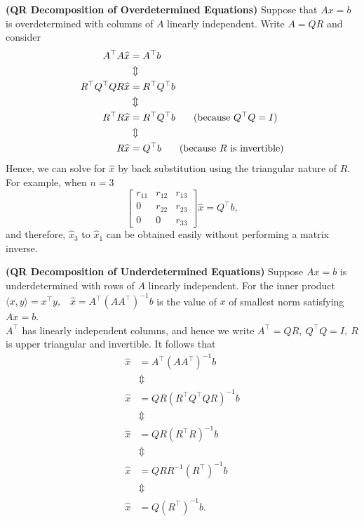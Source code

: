 \begin{example} \textbf{(QR Decomposition of Overdetermined Equations)} Suppose that $Ax=b$ is overdetermined with columns of $A$ linearly independent. Write $A=QR$ and consider
	        \begin{align*}
	            A^\top A\widehat{x}&=A^\top b\\
	            & \Updownarrow \\
	           R^\top Q^\top QR \widehat{x}& = R^\top Q^\top b\\
	           & \Updownarrow \\
	           R^\top R \widehat{x}& = R^\top Q^\top b \textnormal{ \hspace{1pc} (because $Q^\top Q = I$)}\\
	            & \Updownarrow \\
	           R \widehat{x} & =  Q^\top b \textnormal{ \hspace{1pc} (because $R$ is invertible)}
	        \end{align*}
Hence, we can solve for $\widehat{x}$ by back substitution using the triangular nature of $R$.	        For example, when $n=3$
	        $$\begin{bmatrix} r_{11} & r_{12} & r_{13}\\ 0 & r_{22} &r_{23}\\ 0 & 0 & r_{33} \end{bmatrix}\widehat{x}=Q^\top b,$$
and therefore, $\widehat{x}_3$ to $\widehat{x}_1$ can be obtained easily without performing a matrix inverse.
\end{example}

\begin{example} \textbf{(QR Decomposition of Underdetermined Equations)} Suppose $Ax=b$ is underdetermined with rows of $A$ linearly independent. For the inner product $\langle x,y\rangle=x^\top y,$  \
$\widehat{x}=A^\top (AA^\top)^{-1}b$ is the value of $x$ of smallest norm satisfying $Ax=b$.\\

$A^\top$ has linearly independent columns, and hence we write $A^\top=QR,\ Q^\top Q=I,\ R$ is upper triangular and invertible. It follows that
            \begin{align*}
            \widehat{x}& =A^\top (AA^\top)^{-1}b \\
             & \Updownarrow \\
	          \widehat{x}&= Q R \left(R^\top Q^\top Q R  \right)^{-1} b\\
	             & \Updownarrow \\
	            \widehat{x}&=QR(R^\top R)^{-1}b\\
	             & \Updownarrow \\
	           \widehat{x} &=QRR^{-1}(R^\top)^{-1}b\\
	             & \Updownarrow \\
	            \widehat{x}&=Q(R^\top)^{-1}b.
            \end{align*}
\Qed            
\end{example} 

